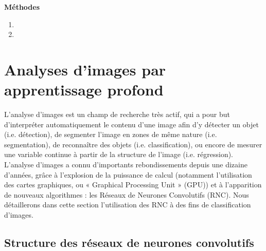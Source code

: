 \setcounter{section}{0} %
\renewcommand*{\theHsection}{chY.\the\value{section}}
\centerline{\bfseries\textcolor{bleusection}{ \Huge Méthodes}}  

\bigskip


{\LARGE
\begin{enumerate}[label=\textcolor{bleusection}{\arabic*}{.}, leftmargin=2cm]
  \item {}
  \item {}
\end{enumerate}
}

\clearpage
\pagestyle{methodo}

\section{Analyses d'images par apprentissage profond}\label{methodes.1}

L’analyse d’images est un champ de recherche très actif, qui a pour but d’interpréter automatiquement le contenu d’une image afin d’y détecter un objet (i.e. détection), de segmenter l’image en zones de même nature (i.e. segmentation), de reconnaître des objets (i.e. classification), ou encore de mesurer une variable continue à partir de la structure de l’image (i.e. régression). L’analyse d’images a connu d’importants rebondissements depuis une dizaine d’années, grâce à l’explosion de la puissance de calcul (notamment l’utilisation des cartes graphiques, ou « Graphical Processing Unit » (GPU)) et à l’apparition de nouveaux algorithmes : les Réseaux de Neurones Convolutifs (RNC). Nous détaillerons dans cette section l’utilisation des RNC à des fins de classification d’images.

\subsection{Structure des réseaux de neurones convolutifs}

